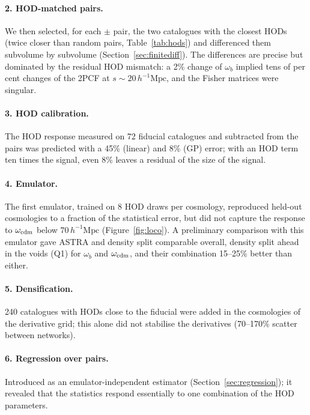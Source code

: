 \documentclass[11pt,twocolumn]{article}
\newcommand{\Mpch}{\,h^{-1}\mathrm{Mpc}}
\begin{document}
\paragraph{2. HOD-matched pairs.} We then selected, for each $\pm$ pair, the two catalogues with the closest HODs (twice closer than random pairs, Table~\ref{tab:hods}) and differenced them subvolume by subvolume (Section~\ref{sec:finitediff}). The differences are precise but dominated by the residual HOD mismatch: a 2\% change of $\omega_b$ implied tens of per cent changes of the 2PCF at $s\sim20\Mpch$, and the Fisher matrices were singular.

\paragraph{3. HOD calibration.} The HOD response measured on 72 fiducial catalogues and subtracted from the pairs was predicted with a 45\% (linear) and 8\% (GP) error; with an HOD term ten times the signal, even 8\% leaves a residual of the size of the signal.

\paragraph{4. Emulator.} The first emulator, trained on 8 HOD draws per cosmology, reproduced held-out cosmologies to a fraction of the statistical error, but did not capture the response to $\omega_{\rm cdm}$ below $70\Mpch$ (Figure~\ref{fig:loco}). A preliminary comparison with this emulator gave ASTRA and density split comparable overall, density split ahead in the voids (Q1) for $\omega_b$ and $\omega_{\rm cdm}$, and their combination 15--25\% better than either.

\paragraph{5. Densification.} 240 catalogues with HODs close to the fiducial were added in the cosmologies of the derivative grid; this alone did not stabilise the derivatives (70--170\% scatter between networks).

\paragraph{6. Regression over pairs.} Introduced as an emulator-independent estimator (Section~\ref{sec:regression}); it revealed that the statistics respond essentially to one combination of the HOD parameters.
\end{document}
